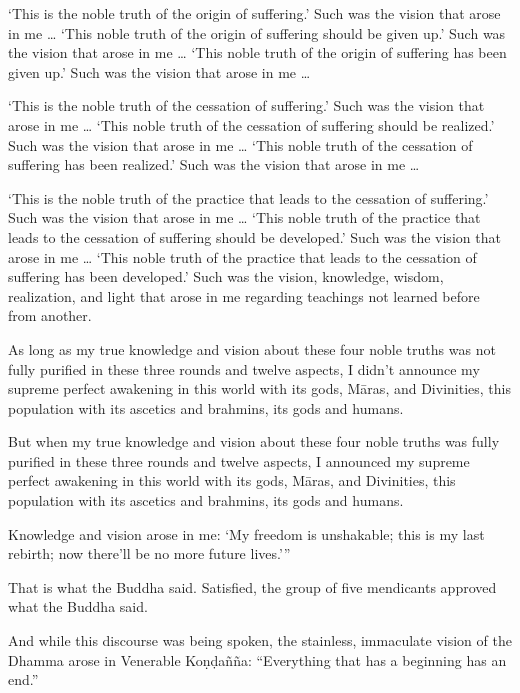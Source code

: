 \documentclass[12pt,openany]{book}%
\begin{document}
‘This is the noble truth of the origin of suffering.’ Such was the vision that arose in me … ‘This noble truth of the origin of suffering should be given up.’ Such was the vision that arose in me … ‘This noble truth of the origin of suffering has been given up.’ Such was the vision that arose in me … 

‘This is the noble truth of the cessation of suffering.’ Such was the vision that arose in me … ‘This noble truth of the cessation of suffering should be realized.’ Such was the vision that arose in me … ‘This noble truth of the cessation of suffering has been realized.’ Such was the vision that arose in me … 

‘This is the noble truth of the practice that leads to the cessation of suffering.’ Such was the vision that arose in me … ‘This noble truth of the practice that leads to the cessation of suffering should be developed.’ Such was the vision that arose in me … ‘This noble truth of the practice that leads to the cessation of suffering has been developed.’ Such was the vision, knowledge, wisdom, realization, and light that arose in me regarding teachings not learned before from another. 

As long as my true knowledge and vision about these four noble truths was not fully purified in these three rounds and twelve aspects, I didn’t announce my supreme perfect awakening in this world with its gods, \textsanskrit{Māras}, and Divinities, this population with its ascetics and brahmins, its gods and humans. 

But when my true knowledge and vision about these four noble truths was fully purified in these three rounds and twelve aspects, I announced my supreme perfect awakening in this world with its gods, \textsanskrit{Māras}, and Divinities, this population with its ascetics and brahmins, its gods and humans. 

Knowledge and vision arose in me: ‘My freedom is unshakable; this is my last rebirth; now there’ll be no more future lives.’” 

That is what the Buddha said. Satisfied, the group of five mendicants approved what the Buddha said. 

And while this discourse was being spoken, the stainless, immaculate vision of the Dhamma arose in Venerable \textsanskrit{Koṇḍañña}: “Everything that has a beginning has an end.” 
\end{document}

